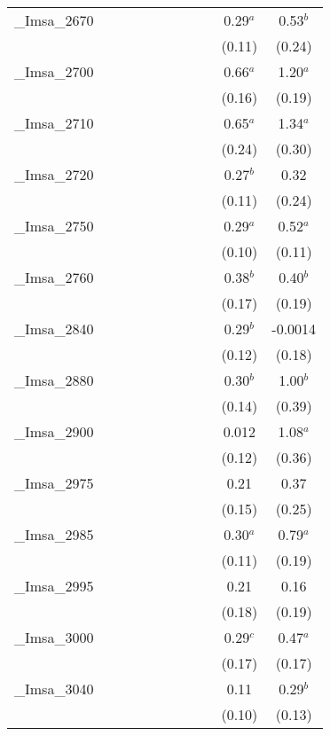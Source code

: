 \documentclass[]{article}
\begin{document}
\begin{tabular}{lcccccccccc}
\_Imsa\_2670 &  &  &  &  &  &  &  &  & 0.29$^a$ & 0.53$^b$ \\
 &  &  &  &  &  &  &  &  & (0.11) & (0.24) \\
\_Imsa\_2700 &  &  &  &  &  &  &  &  & 0.66$^a$ & 1.20$^a$ \\
 &  &  &  &  &  &  &  &  & (0.16) & (0.19) \\
\_Imsa\_2710 &  &  &  &  &  &  &  &  & 0.65$^a$ & 1.34$^a$ \\
 &  &  &  &  &  &  &  &  & (0.24) & (0.30) \\
\_Imsa\_2720 &  &  &  &  &  &  &  &  & 0.27$^b$ & 0.32 \\
 &  &  &  &  &  &  &  &  & (0.11) & (0.24) \\
\_Imsa\_2750 &  &  &  &  &  &  &  &  & 0.29$^a$ & 0.52$^a$ \\
 &  &  &  &  &  &  &  &  & (0.10) & (0.11) \\
\_Imsa\_2760 &  &  &  &  &  &  &  &  & 0.38$^b$ & 0.40$^b$ \\
 &  &  &  &  &  &  &  &  & (0.17) & (0.19) \\
\_Imsa\_2840 &  &  &  &  &  &  &  &  & 0.29$^b$ & -0.0014 \\
 &  &  &  &  &  &  &  &  & (0.12) & (0.18) \\
\_Imsa\_2880 &  &  &  &  &  &  &  &  & 0.30$^b$ & 1.00$^b$ \\
 &  &  &  &  &  &  &  &  & (0.14) & (0.39) \\
\_Imsa\_2900 &  &  &  &  &  &  &  &  & 0.012 & 1.08$^a$ \\
 &  &  &  &  &  &  &  &  & (0.12) & (0.36) \\
\_Imsa\_2975 &  &  &  &  &  &  &  &  & 0.21 & 0.37 \\
 &  &  &  &  &  &  &  &  & (0.15) & (0.25) \\
\_Imsa\_2985 &  &  &  &  &  &  &  &  & 0.30$^a$ & 0.79$^a$ \\
 &  &  &  &  &  &  &  &  & (0.11) & (0.19) \\
\_Imsa\_2995 &  &  &  &  &  &  &  &  & 0.21 & 0.16 \\
 &  &  &  &  &  &  &  &  & (0.18) & (0.19) \\
\_Imsa\_3000 &  &  &  &  &  &  &  &  & 0.29$^c$ & 0.47$^a$ \\
 &  &  &  &  &  &  &  &  & (0.17) & (0.17) \\
\_Imsa\_3040 &  &  &  &  &  &  &  &  & 0.11 & 0.29$^b$ \\
 &  &  &  &  &  &  &  &  & (0.10) & (0.13) \\

\end{tabular}
\end{document}
